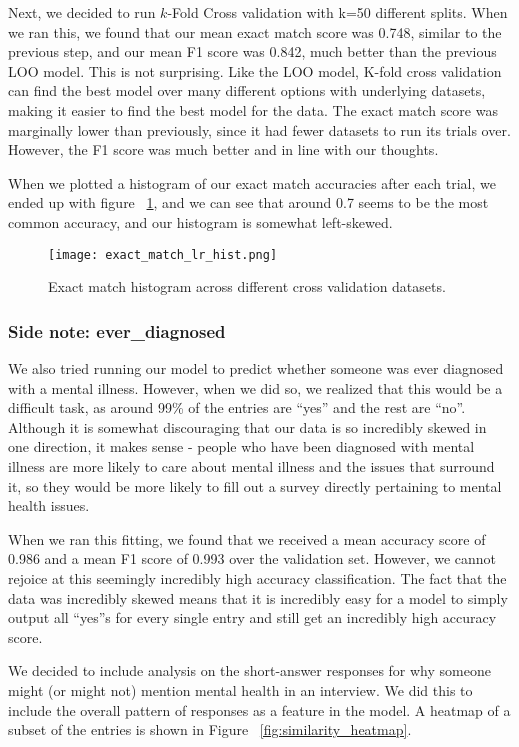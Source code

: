 \documentclass[times, twocolumn]{article}
\begin{document}
Next, we decided to run $k$-Fold Cross validation with k=50 different splits.
When we ran this, we found that our mean exact match score was 0.748, similar
to the previous step, and our mean F1 score was 0.842, much better than the
previous LOO model. This is not surprising. Like the LOO model, K-fold cross
validation can find the best model over many different options with underlying datasets,
making it easier to find the best model for the data. The exact match score was
marginally lower than previously, since it had fewer datasets to run its trials over.
However, the F1 score was much better and in line with our thoughts.

When we plotted a histogram of our exact match accuracies after each trial, we
ended up with figure ~\ref{fig:exact_match_lr_hist}, and we can see that around
0.7 seems to be the most common accuracy, and our histogram is somewhat left-skewed.

\begin{figure}
    \centering
    \texttt{[image: exact\_match\_lr\_hist.png]}
    \caption{Exact match histogram across different cross validation datasets.}
    \label{fig:exact_match_lr_hist}
\end{figure}

\subsubsection{Side note: ever\_diagnosed}
We also tried running our model to predict whether someone was ever diagnosed
with a mental illness. However, when we did so, we realized that this would be
a difficult task, as around 99\% of the entries are “yes” and the rest are “no”.
Although it is somewhat discouraging that our data is so incredibly skewed in one
direction, it makes sense - people who have been diagnosed with mental illness
are more likely to care about mental illness and the issues that surround it, so
they would be more likely to fill out a survey directly pertaining to mental health issues.

When we ran this fitting, we found that we received a mean accuracy score of
0.986 and a mean F1 score of 0.993 over the validation set. However, we cannot
rejoice at this seemingly incredibly high accuracy classification. The fact that
the data was incredibly skewed means that it is incredibly easy for a model to
simply output all “yes”s for every single entry and still get an incredibly high
accuracy score.


We decided to include analysis on the short-answer responses for why someone
might (or might not) mention mental health in an interview. We did this to include
the overall pattern of responses as a feature in the model. A heatmap of a
subset of the entries is shown in Figure ~\ref{fig:similarity_heatmap}.
\end{document}
